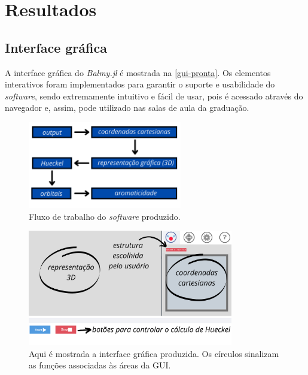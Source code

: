 \chapter{Resultados}

\section{Interface gráfica}\label{design}

A interface gráfica do \textit{Balmy.jl} é mostrada na \autoref{gui-pronta}. Os elementos interativos foram implementados para garantir o suporte e usabilidade do \textit{software}, sendo extremamente intuitivo e fácil de usar, pois é acessado através do navegador e, assim, pode utilizado nas salas de aula da graduação.

\begin{figure}[htb]
	\caption{\label{workflow} Fluxo de trabalho do \textit{software} produzido.}
	\begin{center}
		\includegraphics[width=0.6\textwidth]{images/workflow.png}
	\end{center}
\end{figure}

\begin{figure}[htb]
	\caption{\label{gui-pronta} Aqui é mostrada a interface gráfica produzida. Os círculos sinalizam as funções associadas às áreas da \gls{GUI}.}
	\begin{center}
		\includegraphics[width=0.8\textwidth]{images/GUI-EXAMPLE.png}
	\end{center}
\end{figure}

